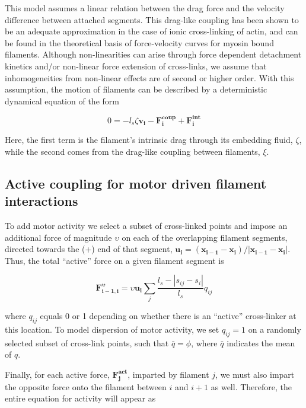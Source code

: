 This model assumes a linear relation between the drag force and the velocity difference between attached segments.  This drag-like coupling has been shown to be an adequate approximation in the case of ionic cross-linking of actin\cite{mol_fric,theo_hydroish2}, and can be found in the theoretical basis of force-velocity curves for myosin bound filaments\cite{theo_frictionShila}. Although non-linearities can arise through force dependent detachment kinetics and/or non-linear force extension of cross-links, we assume that inhomogeneities from non-linear effects are of second or higher order. With this assumption, the motion of filaments can be described by a deterministic dynamical equation of the form

\begin{equation}
\label{eqn:syst1}
0 = -l_s\zeta\mathbf{ v_i} -\mathbf{F^{coup}_i}+ \mathbf{F^{int}_i}
\end{equation}

Here, the first term is the filament's intrinsic drag through its embedding fluid, $\zeta$, while the second comes from the drag-like coupling between filaments, $\xi$.  

\subsection{Active coupling for motor driven filament interactions}

To add motor activity we select a subset of cross-linked points and impose an additional force of magnitude $\upsilon$ on each of the overlapping filament segments, directed towards the (+) end of that segment, $\mathbf{u_i}=(\mathbf{x_{i-1}}-\mathbf{x_{i}})/|\mathbf{x_{i-1}}-\mathbf{x_{i}}|$. Thus, the total ``active'' force on a given filament segment is

\begin{equation}
\label{eqn:moto}
\mathbf{F^{\upsilon}_{i-1,i}}=\upsilon \mathbf{u_i}\sum_j \frac{l_s-|s_{ij}-s_i|}{l_s}q_{ij}
\end{equation}

where $q_{ij}$ equals 0 or 1 depending on whether there is an ``active'' cross-linker at this location. To model dispersion of motor activity, we  set $q_{ij}=1$  on a randomly selected subset of cross-link points, such that $\bar{q}=\phi$, where $\bar{q}$ indicates the mean of $q$.



Finally, for each active force, $\mathbf{F^{act}_j}$, imparted by filament $j$, we must also impart the opposite force onto the filament between $i$ and $i+1$ as well.  Therefore, the entire equation for activity will appear as

